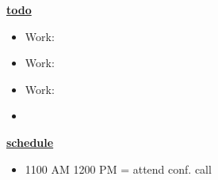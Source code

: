 \underline{\bf todo}
\begin{itemize}
\tiny \item \tiny Work: 
\item \tiny Work:
\item \tiny Work: 
\item \tiny
\end{itemize}

\underline{\bf schedule}
\begin{itemize}
\tiny \item \tiny 1100 AM 1200 PM = attend conf. call
\end{itemize}

